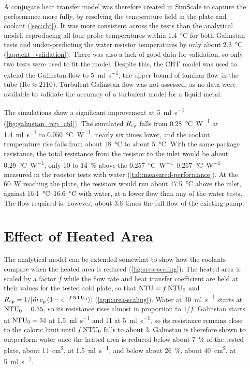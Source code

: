 A conjugate heat transfer model was therefore created in SimScale to capture the
performance more fully, by resolving the temperature field in the plate and
coolant (\cref{sec:cht}). It was more consistent across the tests than the
analytical model, reproducing all four probe temperatures within
\SI{1.4}{\celsius} for both Galinstan tests and under-predicting the water
resistor temperatures by only about \SI{2.3}{\celsius}
(\cref{app:cht_validation}). There was also a lack of good data for validation, so only two tests were used to fit the model.
Despite this, the CHT model was used to extend the Galinstan flow to
\SI{5}{\milli\litre\per\second}, the upper bound of laminar flow in the tube
($\mathrm{Re} \approx 2110$). Turbulent Galinstan flow was not assessed, as no
data were available to validate the accuracy of a turbulent model for a
liquid metal.

The simulations show a significant improvement at \SI{5}{\milli\litre\per\second}
(\cref{fig:galinstan_rcp_cfd}). The simulated $R_{\mathrm{cp}}$ falls from
\SI{0.28}{\celsius\per\watt} at \SI{1.4}{\milli\litre\per\second} to
\SI{0.050}{\celsius\per\watt}, nearly six times lower, and the coolant
temperature rise falls from about \SI{18}{\celsius} to about \SI{5}{\celsius}.
With the same package resistance, the total resistance from the resistor to the
inlet would be about \SI{0.29}{\celsius\per\watt}, only 10 to \SI{14}{\percent}
above the \SIrange{0.257}{0.267}{\celsius\per\watt} measured in the resistor
tests with water (\cref{tab:measured-performance}). At the \SI{60}{\watt}
reaching the plate, the resistors would run about \SI{17.5}{\celsius} above the
inlet, against \SIrange{16.1}{16.6}{\celsius} with water, at a lower flow than
any of the water tests. The flow required is, however, about 3.6 times the full
flow of the existing pump.

\section{Effect of Heated Area}
\label{sec:disc-area}

The analytical model can be extended somewhat to show how the coolants compare when the heated area
is reduced (\cref{fig:area-scaling}). The heated area is scaled by a factor $f$
while the flow rate and heat transfer coefficient are held at their values for
the tested cold plate, so that $\mathrm{NTU} = f\,\mathrm{NTU}_0$ and
$R_{\mathrm{cp}} = 1/[\dot{m}\,c_{\mathrm{p}}\,(1 - e^{-f\,\mathrm{NTU}_0})]$ (\cref{app:area-scaling}). Water at
\SI{30}{\milli\litre\per\second} starts at $\mathrm{NTU}_0 = 0.35$, so its resistance
rises almost in proportion to $1/f$. Galinstan starts at $\mathrm{NTU}_0 = 34$ at
\SI{1.5}{\milli\litre\per\second} and 11 at \SI{5}{\milli\litre\per\second}, so
its resistance remains close to the caloric limit until $f\,\mathrm{NTU}_0$ falls to
about 3. Galinstan is therefore shown to outperform water once the heated area is reduced
below about \SI{7}{\percent} of the tested plate, about \SI{11}{\centi\metre\squared},
at \SI{1.5}{\milli\litre\per\second}, and below about \SI{26}{\percent}, about
\SI{40}{\centi\metre\squared}, at \SI{5}{\milli\litre\per\second}.

